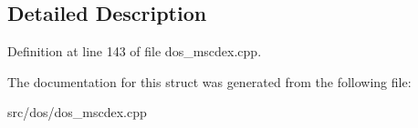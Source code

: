 \subsection{Detailed Description}


Definition at line 143 of file dos\-\_\-mscdex.\-cpp.



The documentation for this struct was generated from the following file\-:\begin{DoxyCompactItemize}
\item 
src/dos/dos\-\_\-mscdex.\-cpp\end{DoxyCompactItemize}
